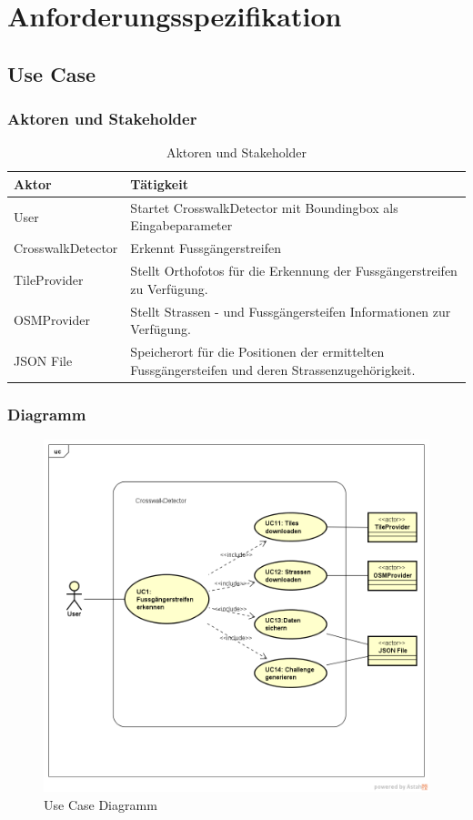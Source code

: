 \section{Anforderungsspezifikation}
\subsection{Use Case}
\subsubsection{Aktoren und Stakeholder}
\begin{table}
    \begin{tabular}{|p{3cm}|p{9cm}|}
    \hline
    Aktor & Tätigkeit   \\ \hline
	User  & Startet CrosswalkDetector mit Boundingbox als Eingabeparameter \\ \hline
	CrosswalkDetector & Erkennt Fussgängerstreifen \\ \hline 
	TileProvider & Stellt Orthofotos für die Erkennung der Fussgängerstreifen zu Verfügung.\\ \hline
	OSMProvider & Stellt Strassen - und Fussgängersteifen Informationen zur Verfügung. \\ \hline
	JSON File & Speicherort für die Positionen der ermittelten Fussgängersteifen und deren Strassenzugehörigkeit.\\ \hline
    \end{tabular}
    \caption[Aktoren und Stakeholder]{Aktoren und Stakeholder}
\end{table}

\subsubsection{Diagramm}
\begin{figure}[H]
\includegraphics[width=\textwidth]{images/UseCase.png}
\caption[Use Case Diagramm]{Use Case Diagramm}
\end{figure}

